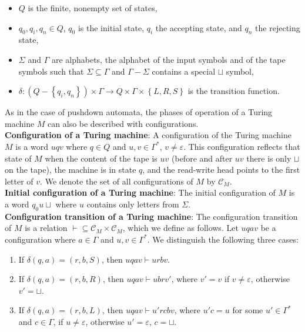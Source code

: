 \documentclass[margin=0px]{article}
\begin{document}
\begin{itemize}

    \item	$Q$ is the finite, nonempty set of states,

    \item	$q_{0}, q_{i}, q_{n} \in Q$, $q_{0}$ is the initial state, $q_{i}$ the accepting state,
          and $q_{n}$ the rejecting state,

    \item	$\Sigma$ and $\Gamma$ are alphabets, the alphabet of the input symbols and of the tape symbols such that
          $\Sigma \subseteq \Gamma$ and $\Gamma - \Sigma$ contains a special $\sqcup$ symbol,

    \item	$\delta : (Q - \left\{q_{i},q_{n}\right\}) \times \Gamma \to Q \times \Gamma \times \left\{L, R, S\right\}$
          is the transition function.

\end{itemize}

As in the case of pushdown automata, the phases of operation of a Turing machine $M$ can also be described with configurations.\\

\noindent \textbf{Configuration of a Turing machine}: A configuration of the Turing machine $M$ is a word $uqv$ where
$q \in Q$ and $u, v \in \Gamma^{*}$, $v \not = \varepsilon$. This configuration reflects that state of $M$
when the content of the tape is $uv$ (before and after $uv$ there is only $\sqcup$ on the tape), the machine is in state $q$,
and the read-write head points to the first letter of $v$. We denote the set of all configurations of $M$ by $\mathcal{C}_{M}$.\\

\noindent \textbf{Initial configuration of a Turing machine}: The initial configuration of $M$ is a word $q_{0}u\sqcup$ where
$u$ contains only letters from $\Sigma$.\\

\noindent \textbf{Configuration transition of a Turing machine}: The configuration transition of $M$ is a relation
$\vdash \subseteq \mathcal{C}_{M} \times \mathcal{C}_{M}$, which we define as follows.
Let $uqav$ be a configuration where $a \in \Gamma$ and $u, v \in \Gamma^{*}$. We distinguish the following three
cases:

\begin{enumerate}

    \item	If $\delta(q,a) = (r, b, S)$, then $uqav \vdash urbv$.

    \item	If $\delta(q,a) = (r, b, R)$, then $uqav \vdash ubrv'$, where $v' = v$ if $v \not = \varepsilon$, otherwise
          $v' = \sqcup$.

    \item	If $\delta(q,a) = (r, b, L)$, then $uqav \vdash u'rcbv$, where $u'c = u$ for some $u' \in \Gamma^{*}$
          and $c \in \Gamma$, if $u \not = \varepsilon$, otherwise $u' = \varepsilon$, $c = \sqcup$.

\end{enumerate}
\end{document}
